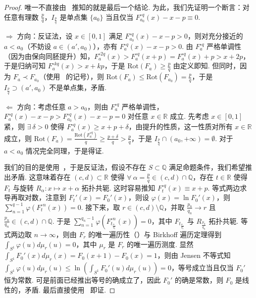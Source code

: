 \documentclass[11pt, a4paper, oneside]{ctexart}
\newcommand{\Q}{\mathbb{Q}}
\newcommand{\R}{\mathbb{R}}
\newcommand{\Rot}{\mathrm{Rot}}
\begin{document}
    \begin{proof}
        唯一不直接由~\cite[第 11 章]{KH95} 推知的就是最后一个结论. 为此，我们先证明一个断言：对任意有理数 $\frac{p}{q}$，$I_{\frac{p}{q}}$ 是单点集 $\{a_0\}$ 当且仅当 $F_{a_0}^{\circ q}(x)-x-p\equiv 0$.
        
        $\Rightarrow$ 方向：反证法，设 $x\in [0,1]$ 满足 $F_{a_0}^{\circ q}(x)-x-p>0$，则对充分接近的 $a<a_0$（不妨设 $a\in (a',a_0)$），亦有 $F_{a}^{\circ q}(x)-x-p>0$. 由 $F_{a}^{\circ q}$ 严格单调性（因为由保向同胚提升）知，$F_{a}^{\circ 2q}(x)>F_{a}^{\circ q}(x+p)=F_{a}^{\circ q}(x)+p>x+2p$，于是归纳可知 $F_a^{\circ kq}(x)>x+kp$，于是 $\Rot(F_a)\geq \frac{p}{q}$ 由定义即知. 但同时，因为 $F_a\prec F_{a_0}$（使用~\cite[定义 11.1.7]{KH95} 的记号），则 $\Rot(F_a)\leq \Rot(F_{a_0})=\frac{p}{q}$，于是 $I_{\frac{p}{q}}\supset (a',a_0)$ 不是单点集，矛盾.

        $\Leftarrow$ 方向：考虑任意 $a>a_0$，则由 $F_{a}^{\circ q}$ 严格单调性，$F_a^{\circ q}(x)-x-p>F_{a_0}^{\circ q}(x)-x-p=0$ 对任意 $x\in\R$ 成立. 先考虑 $x\in [0,1]$ 紧，则 $\exists\ \delta>0$ 使得 $F_a^{\circ q}(x)\geq x+p+\delta$，由提升的性质，这一性质对所有 $x\in\R$ 成立，则 $\Rot(F_a)=\frac{\Rot(F_a^{\circ q})}{q}\geq \frac{p+\delta}{q}>\frac{p}{q}$，于是 $I_{\frac{p}{q}}\cap (a_0,+\infty)=\emptyset$. 对于 $a<a_0$ 情况完全同理，于是得证.

        我们的目的是使用~\cite[命题 11.1.11]{KH95}，于是反证法，假设不存在 $S\subset\Q$ 满足命题条件，我们希望推出矛盾. 这意味着存在 $(c,d)\subset \R$ 使得 $\forall\ \alpha=\frac{p}{q}\in (c,d)\cap \Q$，存在 $t\in \R$ 使得 $F_t$ 与旋转 $R_{\alpha}:x\mapsto x+\alpha$ 拓扑共轭. 这时容易推知 $F_t^{\circ q}(x)\equiv x+p$. 等式两边求导再取对数，注意到 $F_{t}'(x)=F_0'(x)$，则设 $\varphi(x)=\ln F_{0}'(x)$，则 $\sum\limits_{n=1}^{q-1}\varphi(F_{t}^{\circ n}(x))=0$. 接下来，取 $r\in (c,d)\setminus\Q$，并取 $\frac{p_n}{q_n}\to r$ 且 $\frac{p_n}{q_n}\in (c,d)\cap \Q$. 于是 $\sum\limits_{n=1}^{q_n-1}\varphi(F_{t_{\frac{p_n}{q_n}}}^{\circ n}(x))=0$，其中 $F_{t_{\frac{p_n}{q_n}}}$ 与 $R_{\frac{p_n}{q_n}}$ 拓扑共轭. 等式两边取 $n\to\infty$，则由 $F_r$ 的唯一遍历性（\cite[定理 11.2.9]{KH95}）与 Birkhoff 遍历定理得到 $\int_{S^1}\varphi(u)d\mu_{r}(u)=0$，其中 $\mu_r$ 是 $F_r$ 的唯一遍历测度. 显然 $\int_{S^1}F_0'(x)d\mu_r(x)=F_0(x+1)-F_0(x)=1$，则由 Jensen 不等式知 $\int_{S^1}\varphi(u)d\mu_{r}(u)\leq \ln(\int_{S^1}F_0'(u)d\mu_r(u))=0$，等号成立当且仅当 $F_0'$ 恒为常数. 可是前面已经推出等号的确成立了，因此 $F_0'$ 的确是常数，则 $F_0$ 是线性的，矛盾. 最后直接使用~\cite[命题 11.1.11]{KH95} 即证.
    \end{proof}
\end{document}
